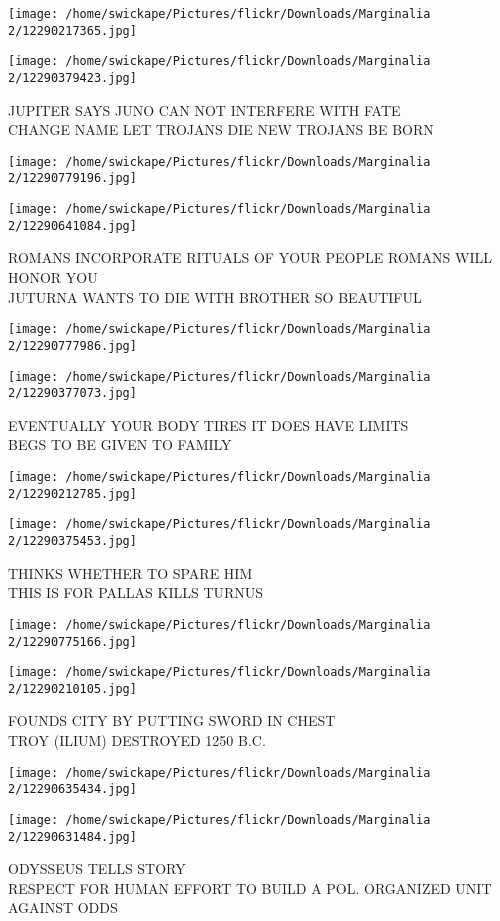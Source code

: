 \documentclass[10pt,letterpaper]{article}
\begin{document}
\texttt{[image: /home/swickape/Pictures/flickr/Downloads/Marginalia 2/12290217365.jpg]}

\vspace{0.25in}
\texttt{[image: /home/swickape/Pictures/flickr/Downloads/Marginalia 2/12290379423.jpg]}

JUPITER SAYS JUNO CAN NOT INTERFERE WITH FATE\\
CHANGE NAME LET TROJANS DIE NEW TROJANS BE BORN
\pagebreak

\texttt{[image: /home/swickape/Pictures/flickr/Downloads/Marginalia 2/12290779196.jpg]}

\vspace{0.25in}
\texttt{[image: /home/swickape/Pictures/flickr/Downloads/Marginalia 2/12290641084.jpg]}

ROMANS INCORPORATE RITUALS OF YOUR PEOPLE ROMANS WILL HONOR YOU\\
JUTURNA WANTS TO DIE WITH BROTHER SO BEAUTIFUL
\pagebreak

\texttt{[image: /home/swickape/Pictures/flickr/Downloads/Marginalia 2/12290777986.jpg]}

\vspace{0.25in}
\texttt{[image: /home/swickape/Pictures/flickr/Downloads/Marginalia 2/12290377073.jpg]}

EVENTUALLY YOUR BODY TIRES IT DOES HAVE LIMITS\\
BEGS TO BE GIVEN TO FAMILY
\pagebreak

\texttt{[image: /home/swickape/Pictures/flickr/Downloads/Marginalia 2/12290212785.jpg]}

\vspace{0.25in}
\texttt{[image: /home/swickape/Pictures/flickr/Downloads/Marginalia 2/12290375453.jpg]}

THINKS WHETHER TO SPARE HIM\\
THIS IS FOR PALLAS KILLS TURNUS
\pagebreak

\texttt{[image: /home/swickape/Pictures/flickr/Downloads/Marginalia 2/12290775166.jpg]}

\vspace{0.25in}
\texttt{[image: /home/swickape/Pictures/flickr/Downloads/Marginalia 2/12290210105.jpg]}

FOUNDS CITY BY PUTTING SWORD IN CHEST\\
TROY (ILIUM) DESTROYED 1250 B.C.
\pagebreak

\texttt{[image: /home/swickape/Pictures/flickr/Downloads/Marginalia 2/12290635434.jpg]}

\vspace{0.25in}
\texttt{[image: /home/swickape/Pictures/flickr/Downloads/Marginalia 2/12290631484.jpg]}

ODYSSEUS TELLS STORY\\
RESPECT FOR HUMAN EFFORT TO BUILD A POL. ORGANIZED UNIT AGAINST ODDS
\pagebreak
\end{document}
